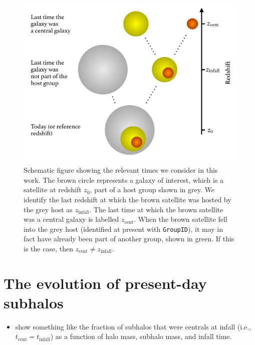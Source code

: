 \documentclass[usenatbib,fleqn]{mnras}
\newcommand{\tcent}{t_\mathrm{cent}}
\newcommand{\tinfall}{t_\mathrm{infall}}
\newcommand{\zcent}{z_\mathrm{cent}}
\newcommand{\zinfall}{z_\mathrm{infall}}
\begin{document}
\begin{figure}
  \centerline{\includegraphics[width=\linewidth]{history_chart.pdf}}
\caption{Schematic figure showing the relevant times we consider in this work. The brown circle represents a galaxy of interest, which is a satellite at redshift $z_0$, part of a host group shown in grey. We identify the last redshift at which the brown satellite was hosted by the grey host as $\zinfall$. The last time at which the brown satellite was a central galaxy is labelled $\zcent$. When the brown satellite fell into the grey host (identified at present with \texttt{GroupID}), it may in fact have already been part of another group, shown in green. If this is the case, then $\zcent \neq \zinfall$.}
\label{f:history_chart}
\end{figure}

\section{The evolution of present-day subhalos}

\begin{itemize}
  \item show something like the fraction of subhalos that were centrals at infall (i.e., $\tcent = \tinfall$) as a function of halo mass, subhalo mass, and infall time.
\end{itemize}
\end{document}
